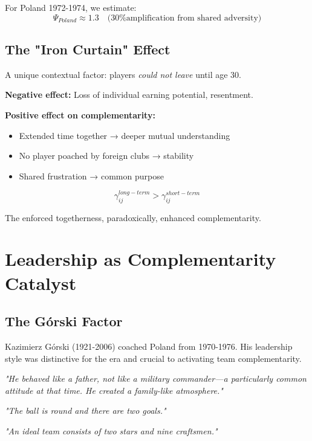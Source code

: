 For Poland 1972-1974, we estimate:
\begin{equation}
\Psi_{Poland} \approx 1.3 \quad \text{(30\% amplification from shared adversity)}
\end{equation}

\subsection{The "Iron Curtain" Effect}

A unique contextual factor: players \textit{could not leave} until age 30.

\textbf{Negative effect:} Loss of individual earning potential, resentment.

\textbf{Positive effect on complementarity:}
\begin{itemize}
    \item Extended time together → deeper mutual understanding
    \item No player poached by foreign clubs → stability
    \item Shared frustration → common purpose
\end{itemize}

\begin{equation}
\gamma_{ij}^{long-term} > \gamma_{ij}^{short-term}
\end{equation}

The enforced togetherness, paradoxically, enhanced complementarity.



\section{Leadership as Complementarity Catalyst}
\label{sec:bm-leadership}

\subsection{The Górski Factor}

Kazimierz Górski (1921-2006) coached Poland from 1970-1976. His leadership
style was distinctive for the era and crucial to activating team complementarity.

\begin{tcolorbox}[colback=orange!5!white, colframe=orange!75!black, title=Górski's Leadership Philosophy]

\textit{"He behaved like a father, not like a military commander—a particularly
common attitude at that time. He created a family-like atmosphere."}

\textit{"The ball is round and there are two goals."}

\textit{"An ideal team consists of two stars and nine craftsmen."}

\end{tcolorbox}

